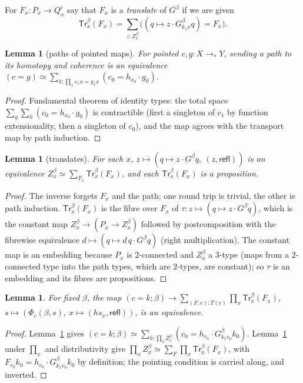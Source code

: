 \documentclass[11pt]{amsart}
\newtheorem{lemma}[theorem]{Lemma}
\theoremstyle{definition}
\theoremstyle{remark}
\newcommand{\refl}{\mathsf{refl}}
\newcommand{\Tl}{\mathsf{Tr}}
\newcommand{\cmp}{\mathbin{;}}
\begin{document}
For $F_x:P_x\to Q^c_x$ say that $F_x$ is a \emph{translate} of $G^\beta$ if we
are given
\[\Tl^\beta_x(F_x)=\sum_{z:Z^\beta_x}\big((q\mapsto z\cdot G^\beta_{k_1x}q)=F_x\big).\]

\begin{lemma}[paths of pointed maps]\label{lem:ptpath}
For pointed $c,g:X\to_*Y$, sending a path to its homotopy and coherence is an
equivalence $(c=g)\simeq\sum_{h:\prod_xc_1x=g_1x}(c_0=h_{x_0}\cdot g_0)$.
\end{lemma}
\begin{proof}
Fundamental theorem of identity types: the total space
$\sum_g\sum_h(c_0=h_{x_0}\cdot g_0)$ is contractible (first a singleton of
$c_1$ by function extensionality, then a singleton of $c_0$), and the map
agrees with the transport map by path induction.
\end{proof}

\begin{lemma}[translates]\label{lem:transl}
For each $x$, $z\mapsto(q\mapsto z\cdot G^\beta q,\ (z,\refl))$ is an
equivalence $Z^\beta_x\simeq\sum_{F_x}\Tl^\beta_x(F_x)$, and each
$\Tl^\beta_x(F_x)$ is a proposition.
\end{lemma}
\begin{proof}
The inverse forgets $F_x$ and the path; one round trip is trivial, the other is
path induction. $\Tl^\beta_x(F_x)$ is the fibre over $F_x$ of
$\tau:z\mapsto(q\mapsto z\cdot G^\beta q)$, which is the constant map
$Z^\beta_x\to(P_x\to Z^\beta_x)$ followed by postcomposition with the fibrewise
equivalence $d\mapsto(q\mapsto d\,q\cdot G^\beta q)$ (right multiplication). The
constant map is an embedding because $P_x$ is $2$-connected and $Z^\beta_x$ a
$3$-type (maps from a $2$-connected type into the path types, which are
$2$-types, are constant); so $\tau$ is an embedding and its fibres are
propositions.
\end{proof}

\begin{lemma}\label{lem:fac}
For fixed $\beta$, the map
$(c=k\cmp\beta)\to\sum_{(F,e):T(c)}\prod_x\Tl^\beta_x(F_x)$,
$s\mapsto(\Phi_c(\beta,s),\ x\mapsto(hs_x,\refl))$, is an equivalence.
\end{lemma}
\begin{proof}
Lemma~\ref{lem:ptpath} gives
$(c=k\cmp\beta)\simeq\sum_{h:\prod_xZ^\beta_x}(c_0=h_{v_0}\cdot G^\beta_{k_1v_0}k_0)$.
Lemma~\ref{lem:transl} under $\prod_x$ and distributivity give
$\prod_xZ^\beta_x\simeq\sum_F\prod_x\Tl^\beta_x(F_x)$, with
$F_{v_0}k_0=h_{v_0}\cdot G^\beta_{k_1v_0}k_0$ by definition; the pointing
condition is carried along, and inverted.
\end{proof}
\end{document}
